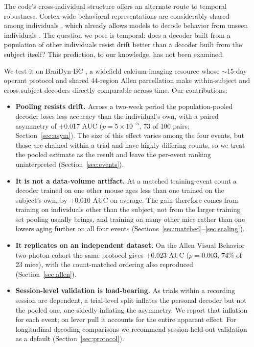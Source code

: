 \documentclass{article}
\newcommand{\auc}{\mathrm{AUC}}
\begin{document}
The code's cross-individual structure offers an alternate route to temporal robustness. Cortex-wide
behavioral representations are considerably shared among individuals
\citep{musall2019,macdowell2020,macdowell2024}, which already allows models to decode behavior from
unseen individuals \citep{wicat2026}. The question we pose is temporal: does a decoder built from a
population of other individuals resist drift better than a decoder built from the subject itself?
This prediction, to our knowledge, has not been examined.

We test it on BraiDyn-BC \citep{kondo2025}, a widefield calcium-imaging resource whose $\sim$15-day
operant protocol and shared 44-region Allen parcellation make within-subject and cross-subject
decoders directly comparable across time. Our contributions:
\begin{itemize}\itemsep2pt
\item \textbf{Pooling resists drift.} Across a two-week period the population-pooled decoder loses
less accuracy than the individual's own, with a paired asymmetry of $+0.017$ $\auc$
($p = 5 \times 10^{-5}$, 73 of 100 pairs; Section~\ref{sec:asym}). The size of this effect varies
among the four events, but those are chained within a trial and have highly differing counts, so we
treat the pooled estimate as the result and leave the per-event ranking uninterpreted
(Section~\ref{sec:events}).
\item \textbf{It is not a data-volume artifact.} At a matched training-event count a decoder trained
on one other mouse ages less than one trained on the subject's own, by $+0.010$ $\auc$ on average.
The gain therefore comes from training on individuals other than the subject, not from the larger
training set pooling usually brings, and training on many other mice rather than one lowers aging
further on all four events (Sections~\ref{sec:matched}--\ref{sec:scaling}).
\item \textbf{It replicates on an independent dataset.} On the Allen Visual Behavior two-photon
cohort the same protocol gives $+0.023$ $\auc$ ($p = 0.003$, 74\% of 23 mice), with the
count-matched ordering also reproduced (Section~\ref{sec:allen}).
\item \textbf{Session-level validation is load-bearing.} As trials within a recording session are
dependent, a trial-level split inflates the personal decoder but not the pooled one, one-sidedly
inflating the asymmetry. We report that inflation for each event; on lever pull it accounts for the
entire apparent effect. For longitudinal decoding comparisons we recommend session-held-out
validation as a default (Section~\ref{sec:protocol}).
\end{itemize}
\end{document}
